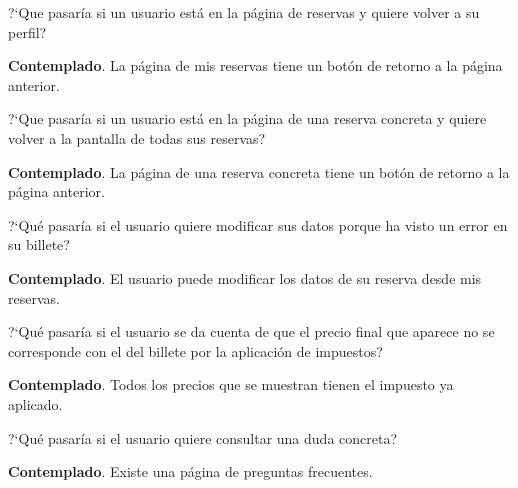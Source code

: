 \begin{escenario} %
    \centering
    ?`Que pasaría si un usuario está en la página de reservas y quiere volver a su perfil?

    \begin{solucion} \centering
          \textbf{Contemplado}. La página de mis reservas tiene un botón de retorno a la página anterior.
    \end{solucion}
\end{escenario}

\begin{escenario} %
    \centering
    ?`Que pasaría si un usuario está en la página de una reserva concreta y quiere volver a la pantalla de todas sus reservas?

    \begin{solucion} \centering
          \textbf{Contemplado}. La página de una reserva concreta tiene un botón de retorno a la página anterior.
    \end{solucion}
\end{escenario}

\begin{escenario} %
    \centering
    ?`Qué pasaría si el usuario quiere modificar sus datos porque ha visto un error en su billete?

    \begin{solucion} \centering
          \textbf{Contemplado}. El usuario puede modificar los datos de su reserva desde mis reservas.
    \end{solucion}
\end{escenario}

\begin{escenario} %
    \centering
    ?`Qué pasaría si el usuario se da cuenta de que el precio final que aparece no se corresponde con el del billete por la aplicación de impuestos?

    \begin{solucion} \centering
          \textbf{Contemplado}. Todos los precios que se muestran tienen el impuesto ya aplicado.

    \end{solucion}
\end{escenario}

\begin{escenario} %
    \centering
    ?`Qué pasaría si el usuario quiere consultar una duda concreta?

    \begin{solucion}
          \centering
          \textbf{Contemplado}. Existe una página de preguntas frecuentes.
    \end{solucion}
\end{escenario}

